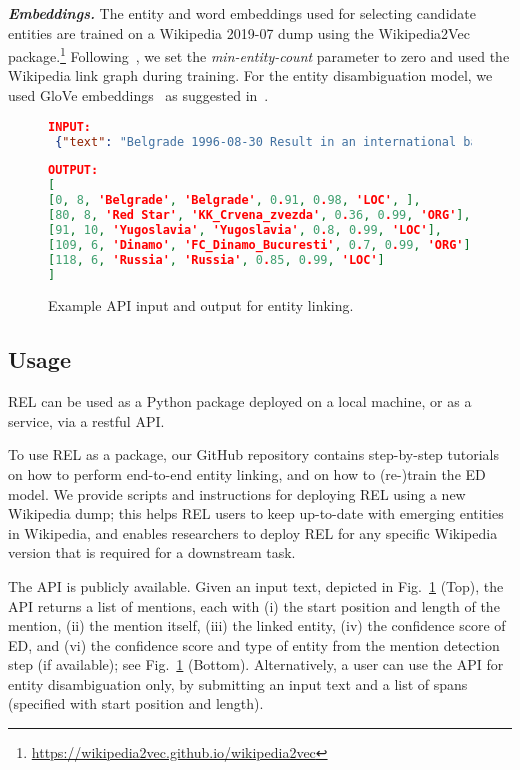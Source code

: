 \documentclass[sigconf]{acmart}
\newcommand{\shrink}{\vspace*{-.9\baselineskip}}
\begin{document}
\noindent
\emph{\textbf{Embeddings.}} The entity and word embeddings used for selecting candidate entities are trained on a Wikipedia 2019-07 dump using the Wikipedia2Vec package.\footnote{\url{https://wikipedia2vec.github.io/wikipedia2vec}} Following~\cite{Gerritse:2020:GEE}, we set the \emph{min-entity-count} parameter to zero and used the Wikipedia link graph during training. For the entity disambiguation model, we used GloVe embeddings~\cite{Pennington:2014:glove} as suggested in~\cite{Le:2018:IEL}. 







\begin{figure}[t]
\caption{Example API input and output for entity linking.}
\label{fig:API}
\scriptsize
\begin{lstlisting}[language=json,firstnumber=1]
INPUT: 
 {"text": "Belgrade 1996-08-30 Result in an international basketball tournament on Friday: Red Star ( Yugoslavia ) beat Dinamo ( Russia) 92-90 ( halftime 47-47 )."}
\end{lstlisting}	

\begin{lstlisting}[language=json,firstnumber=1]
OUTPUT:
[
[0, 8, 'Belgrade', 'Belgrade', 0.91, 0.98, 'LOC', ], 
[80, 8, 'Red Star', 'KK_Crvena_zvezda', 0.36, 0.99, 'ORG'], 
[91, 10, 'Yugoslavia', 'Yugoslavia', 0.8, 0.99, 'LOC'], 
[109, 6, 'Dinamo', 'FC_Dinamo_Bucuresti', 0.7, 0.99, 'ORG'], 
[118, 6, 'Russia', 'Russia', 0.85, 0.99, 'LOC']
]
\end{lstlisting}
\shrink	
\end{figure}


\subsection{Usage}
REL can be used as a Python package deployed on a local machine, or as a service, via a restful API.

To use REL as a package, our GitHub repository contains step-by-step tutorials on how to perform end-to-end entity linking, and on how to (re-)train the ED model. We provide scripts and instructions for deploying REL using a new Wikipedia dump; this helps REL users to keep up-to-date with emerging entities in Wikipedia, and enables researchers to deploy REL for any specific Wikipedia version that is required for a downstream task.

The API is publicly available. Given an input text, depicted in Fig.~\ref{fig:API} (Top), the API returns a list of mentions, each with (i) the start position and length of the mention, (ii) the mention itself, (iii) the linked entity, (iv) the confidence score of ED, and (vi) the confidence score and type of entity from the mention detection step (if available); see Fig.~\ref{fig:API} (Bottom).  Alternatively, a user can use the API for entity disambiguation only, by submitting an input text and a list of spans (specified with start position and length). 
\end{document}
